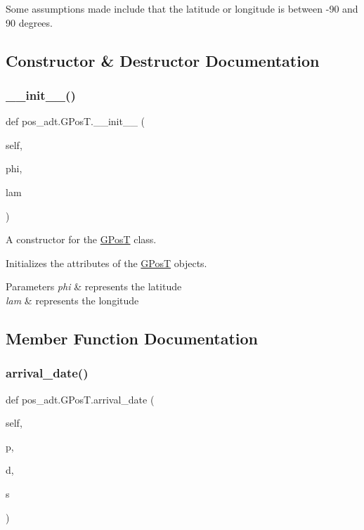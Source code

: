 Some assumptions made include that the latitude or longitude is between -\/90 and 90 degrees. 

\subsection{Constructor \& Destructor Documentation}
\mbox{\label{classpos__adt_1_1_g_pos_t_afedced57a1fc21337f8b67b5cf22b3bd}} 
\subsubsection{\texorpdfstring{\+\_\+\+\_\+init\+\_\+\+\_\+()}{\_\_init\_\_()}}
{\footnotesize\ttfamily def pos\+\_\+adt.\+G\+Pos\+T.\+\_\+\+\_\+init\+\_\+\+\_\+ (\begin{DoxyParamCaption}\item[{}]{self,  }\item[{}]{phi,  }\item[{}]{lam }\end{DoxyParamCaption})}



A constructor for the \hyperlink{classpos__adt_1_1_g_pos_t}{G\+PosT} class. 

Initializes the attributes of the \hyperlink{classpos__adt_1_1_g_pos_t}{G\+PosT} objects. 
\begin{DoxyParams}{Parameters}
{\em phi} & represents the latitude \\
\hline
{\em lam} & represents the longitude \\
\hline
\end{DoxyParams}


\subsection{Member Function Documentation}
\mbox{\label{classpos__adt_1_1_g_pos_t_a5a92fc2c750bc5fda289e7fbfb98bdf6}} 
\subsubsection{\texorpdfstring{arrival\+\_\+date()}{arrival\_date()}}
{\footnotesize\ttfamily def pos\+\_\+adt.\+G\+Pos\+T.\+arrival\+\_\+date (\begin{DoxyParamCaption}\item[{}]{self,  }\item[{}]{p,  }\item[{}]{d,  }\item[{}]{s }\end{DoxyParamCaption})}



